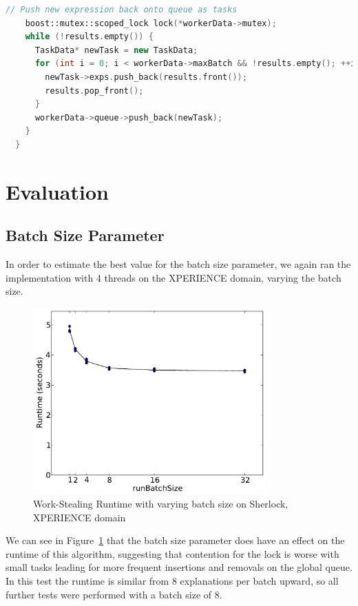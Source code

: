 \documentclass[12pt,twoside,abbrevs,msc,ai,notimes,logo,sansheadings]{infthesis}
\begin{document}
\begin{lstlisting}[language=C++]
    // Push new expression back onto queue as tasks
    boost::mutex::scoped_lock lock(*workerData->mutex);
    while (!results.empty()) {
      TaskData* newTask = new TaskData;
      for (int i = 0; i < workerData->maxBatch && !results.empty(); ++i) {
        newTask->exps.push_back(results.front());
        results.pop_front();
      }
      workerData->queue->push_back(newTask);
    }
  }
  \end{lstlisting}

  
  \section{Evaluation}
  
  \subsection{Batch Size Parameter}
  
  In order to estimate the best value for the batch size parameter, we again ran the implementation with 4 threads on the XPERIENCE domain, varying the batch size.
  
  \begin{figure}[!htbp]
  \begin{centering}
  \includegraphics[width=0.8\textwidth]{images/batch-xper5-sherlock-4-1}
  \par\end{centering}
  \caption{Work-Stealing Runtime with varying batch size on Sherlock, XPERIENCE domain}
  \label{fig:batch-4}
  \end{figure}
  
  We can see in Figure~\ref{fig:batch-4} that the batch size parameter does have an effect on the runtime of this algorithm, suggesting that contention for the lock is worse with small tasks leading for more frequent insertions and removals on the global queue. In this test the runtime is similar from 8 explanations per batch upward, so all further tests were performed with a batch size of 8.
  
\end{document}
